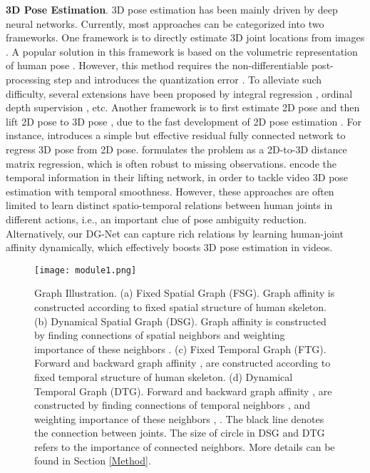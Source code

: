 \documentclass[journal]{IEEEtran}
\begin{document}
\textbf{3D Pose Estimation}.
3D pose estimation has been mainly
driven by deep neural networks. Currently, most approaches can be categorized into two frameworks.
One framework is to directly estimate 3D joint locations from images \cite{mono_3dhp2017,volumetric,integral,ordinal}.
A popular solution in this framework is based on the volumetric representation of human pose \cite{volumetric}.
However,
this method requires the non-differentiable post-processing step and introduces the quantization error \cite{integral}.
To alleviate such difficulty,
several extensions have been proposed by
integral regression \cite{integral},
ordinal depth supervision \cite{ordinal},
etc.
Another framework is to first estimate 2D pose and then lift 2D pose to 3D pose \cite{simple,semanticsgcn,Ci_2019_ICCV,Cai_2019_ICCV,lin2019trajectory,wang2020motion},
due to the fast development of 2D pose estimation \cite{alej2016stacked,cpn}.
For instance,
\cite{simple} introduces a simple but effective residual fully connected network to regress 3D pose from 2D pose.
 \cite{distance} formulates the problem as a 2D-to-3D distance matrix regression,
which is often robust to missing observations.
\cite{eccv2018temporal,Lee_2018_ECCV,pavllo:videopose3d:2019} encode the temporal information in their lifting network,
in order to tackle video 3D pose estimation with temporal smoothness.
However,
these approaches are often limited to learn distinct spatio-temporal relations between human joints in different actions,
i.e.,
an important clue of pose ambiguity reduction.
Alternatively,
our DG-Net can capture rich relations by learning human-joint affinity dynamically,
which effectively boosts 3D pose estimation in videos.





\begin{figure*}[t]
\centering
\texttt{[image: module1.png]}
\caption{Graph Illustration.
(a) Fixed Spatial Graph (FSG).
Graph affinity  is constructed according to fixed spatial structure of human skeleton.
(b) Dynamical Spatial Graph (DSG).
Graph affinity  is constructed by finding connections of spatial neighbors  and weighting importance of these neighbors .
(c) Fixed Temporal Graph (FTG).
Forward and backward graph affinity ,  are constructed according to fixed temporal structure of human skeleton.
(d) Dynamical Temporal Graph (DTG).
Forward and backward graph affinity ,  are constructed by finding connections of temporal neighbors ,  and weighting importance of these neighbors , .
The black line denotes the connection between joints.
The size of circle in DSG and DTG refers to the importance of connected neighbors.
More details can be found in Section \ref{Method}.}
\label{model}
\vspace{-0.3cm}
\end{figure*}
\end{document}
